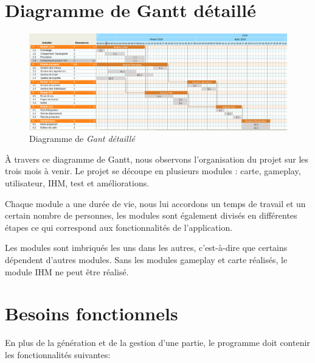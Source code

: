 \documentclass{report}
\begin{document}
    \section{Diagramme de Gantt détaillé}
    
    \begin{figure}[H]
	\caption{Diagramme de \textit{Gant détaillé}}
	\includegraphics[width=17cm]{ganttDetaille.png}
    \end{figure}
   
     À travers ce diagramme de Gantt, nous observons l'organisation du projet sur les trois mois à venir. Le projet se découpe en plusieurs modules : carte, gameplay, utilisateur, IHM, test et améliorations.
    
    Chaque module a une durée de vie, nous lui accordons un temps de travail et un certain nombre de personnes, les modules sont également divisés en différentes étapes ce qui correspond aux fonctionnalités de l'application. 
    
    Les modules sont imbriqués les uns dans les autres, c'est-à-dire que certains dépendent d'autres modules. Sans les modules gameplay et carte réalisés, le module IHM ne peut être réalisé. 
\newpage
   \section{Besoins fonctionnels}
   
    En plus de la génération et de la gestion d'une partie, le programme doit contenir les fonctionnalités suivantes:
\end{document}
